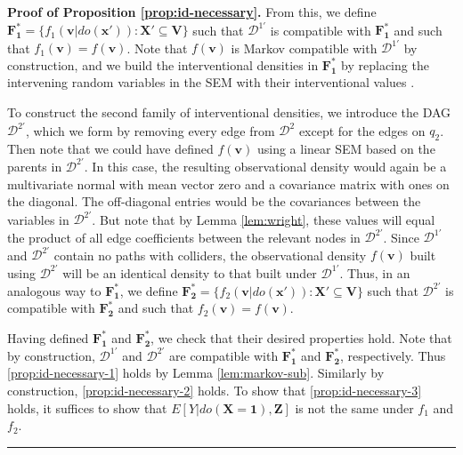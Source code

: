 \documentclass[11pt]{article}
\newcommand{\BlackBox}{\rule{1.5ex}{1.5ex}}  %
\newcommand{\mb}[1]{\mathbf{#1}}
\newcommand{\g}[1][G]{\mathcal{#1}}
\newenvironment{proofof}[1][]{\noindent \textbf{Proof of #1.}}{\hfill\BlackBox}
\begin{document}
\begin{proofof}[Proposition \ref{prop:id-necessary}]
    From this, we define $\mb{F^*_1} = \{ f_1(\mb{v}|do(\mb{x'})) : \mb{X'} \subseteq \mb{V} \}$ such that $\g[D]^{1'}$ is compatible with $\mb{F^*_1}$ and such that $f_1(\mb{v}) = f(\mb{v})$. Note that $f(\mb{v})$ is Markov compatible with $\g[D]^{1'}$ by construction, and we build the interventional densities in $\mb{F^*_1}$ by replacing the intervening random variables in the SEM with their interventional values \citep{pearl2009causality}.

    To construct the second family of interventional densities, we introduce the DAG $\g[D]^{2'}$, which we form by removing every edge from $\g[D]^2$ except for the edges on $q_2$. Then note that we could have defined $f(\mb{v})$ using a linear SEM based on the parents in $\g[D]^{2'}$. In this case, the resulting observational density would again be a multivariate normal with mean vector zero and a covariance matrix with ones on the diagonal. The off-diagonal entries would be the covariances between the variables in $\g[D]^{2'}$. But note that by Lemma \ref{lem:wright}, these values will equal the product of all edge coefficients between the relevant nodes in $\g[D]^{2'}$. Since $\g[D]^{1'}$ and $\g[D]^{2'}$ contain no paths with colliders, the observational density $f(\mb{v})$ built using $\g[D]^{2'}$ will be an identical density to that built under $\g[D]^{1'}$. Thus, in an analogous way to $\mb{F^*_1}$, we define $\mb{F^*_2} = \{ f_2(\mb{v}|do(\mb{x'})) : \mb{X'} \subseteq \mb{V} \}$ such that $\g[D]^{2'}$ is compatible with $\mb{F^*_2}$ and such that $f_2(\mb{v}) = f(\mb{v})$.
        
    Having defined $\mb{F^*_1}$ and $\mb{F^*_2}$, we check that their desired properties hold. Note that by construction, $\g[D]^{1'}$ and $\g[D]^{2'}$ are compatible with $\mb{F^*_1}$ and $\mb{F^*_2}$, respectively. Thus \ref{prop:id-necessary-1} holds by Lemma \ref{lem:markov-sub}. Similarly by construction, \ref{prop:id-necessary-2} holds. To show that \ref{prop:id-necessary-3} holds, it suffices to show that $E[Y | do(\mb{X}=\mb{1}), \mb{Z}]$ is not the same under $f_1$ and $f_2$. 


\end{proofof}
\end{document}
